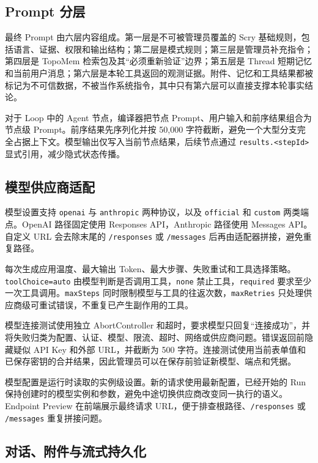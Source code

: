 \documentclass[conference,10pt]{IEEEtran}
\newcommand{\code}[1]{\texttt{#1}}
\begin{document}
\subsection{Prompt 分层}

最终 Prompt 由六层内容组成。第一层是不可被管理员覆盖的 Scry 基础规则，包括语言、证据、权限和输出结构；第二层是模式规则；第三层是管理员补充指令；第四层是 TopoMem 检索包及其“必须重新验证”边界；第五层是 Thread 短期记忆和当前用户消息；第六层是本轮工具返回的观测证据。附件、记忆和工具结果都被标记为不可信数据，不被当作系统指令，其中只有第六层可以直接支撑本轮事实结论。

对于 Loop 中的 Agent 节点，编译器把节点 Prompt、用户输入和前序结果组合为节点级 Prompt。前序结果先序列化并按 50,000 字符截断，避免一个大型分支完全占据上下文。模型输出仅写入当前节点结果，后续节点通过 \code{results.<stepId>} 显式引用，减少隐式状态传播。

\subsection{模型供应商适配}

模型设置支持 \code{openai} 与 \code{anthropic} 两种协议，以及 \code{official} 和 \code{custom} 两类端点。OpenAI 路径固定使用 Responses API，Anthropic 路径使用 Messages API\cite{openairesponses,anthropicmessages}。自定义 URL 会去除末尾的 \code{/responses} 或 \code{/messages} 后再由适配器拼接，避免重复路径。

每次生成应用温度、最大输出 Token、最大步骤、失败重试和工具选择策略。\code{toolChoice=auto} 由模型判断是否调用工具，\code{none} 禁止工具，\code{required} 要求至少一次工具调用。\code{maxSteps} 同时限制模型与工具的往返次数，\code{maxRetries} 只处理供应商级可重试错误，不重复已产生副作用的工具。

模型连接测试使用独立 AbortController 和超时，要求模型只回复“连接成功”，并将失败归类为配置、认证、模型、限流、超时、网络或供应商问题。错误返回前隐藏疑似 API Key 和外部 URL，并截断为 500 字符。连接测试使用当前表单值和已保存密钥的合并结果，因此管理员可以在保存前验证新模型、端点和凭据。

模型配置是运行时读取的实例级设置。新的请求使用最新配置，已经开始的 Run 保持创建时的模型实例和参数，避免中途切换供应商改变同一执行的语义。Endpoint Preview 在前端展示最终请求 URL，便于排查根路径、\code{/responses} 或 \code{/messages} 重复拼接问题。

\subsection{对话、附件与流式持久化}
\end{document}
